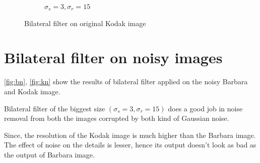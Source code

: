 \documentclass[a4paper, landscape]{article}
\begin{document}
\begin{figure}
\begin{subfigure}{0.33\linewidth}
        \caption{$\sigma_s=3, \sigma_r=15$}
    \end{subfigure}
    \caption{Bilateral filter on original Kodak image}
    \label{fig:ks}
\end{figure}
\section{Bilateral filter on noisy images}
\ref{fig:bn}, \ref{fig:kn} show the results of bilateral filter applied on the noisy Barbara and Kodak image.

Bilateral filter of the biggest size $(\sigma_s=3, \sigma_r=15)$ does a good job in noise removal from both the images corrupted by both kind of Gaussian noise. 

Since, the resolution of the Kodak image is much higher than the Barbara image. The effect of noise on the details is lesser, hence its output doesn't look as bad as the output of Barbara image. 
\end{document}
